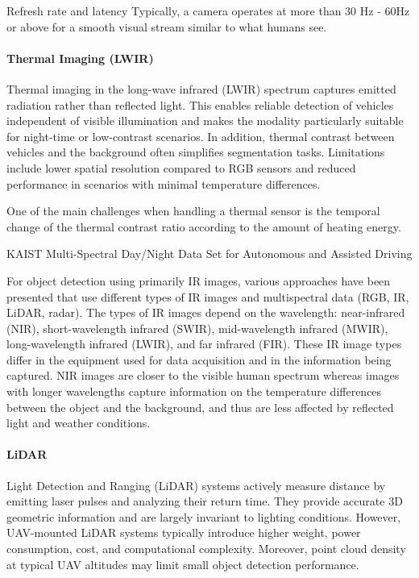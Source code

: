 \documentclass[12pt,oneside,bibtotoc,liststotoc]{scrbook}
\begin{document}
Refresh rate and latency
Typically, a camera operates at more than 30 Hz - 60Hz or above for a smooth
visual stream similar to what humans see.
\cite{wu2025comparativeAnalysisLiDARRadarCamera}

\paragraph{Thermal Imaging (LWIR)}

Thermal imaging in the long-wave infrared (LWIR) spectrum
captures emitted radiation rather than reflected light. This
enables reliable detection of vehicles independent of visible
illumination and makes the modality particularly suitable for
night-time or low-contrast scenarios. In addition, thermal
contrast between vehicles and the background often simplifies
segmentation tasks. Limitations include lower spatial resolution
compared to RGB sensors and reduced performance in scenarios
with minimal temperature differences.

 One of
the main challenges when handling a thermal sensor is the
temporal change of the thermal contrast ratio according to the
amount of heating energy. 

KAIST Multi-Spectral Day/Night Data Set for Autonomous 
and Assisted Driving



For object detection using primarily IR images, various approaches
have been presented that use different types of IR images and multispectral data (RGB, IR, LiDAR, radar). The types of IR images depend on
the wavelength: near-infrared (NIR), short-wavelength infrared (SWIR),
mid-wavelength infrared (MWIR), long-wavelength infrared (LWIR),
and far infrared (FIR). These IR image types differ in the equipment
used for data acquisition and in the information being captured. NIR
images are closer to the visible human spectrum whereas images with
longer wavelengths capture information on the temperature differences
between the object and the background, and thus are less affected
by reflected light and weather conditions.
\cite{bustos2023reviewObjectDetectionIR}

\paragraph{LiDAR}

Light Detection and Ranging (LiDAR) systems actively measure
distance by emitting laser pulses and analyzing their return
time. They provide accurate 3D geometric information and are
largely invariant to lighting conditions. However, UAV-mounted
LiDAR systems typically introduce higher weight, power
consumption, cost, and computational complexity. Moreover,
point cloud density at typical UAV altitudes may limit small
object detection performance.
\end{document}
